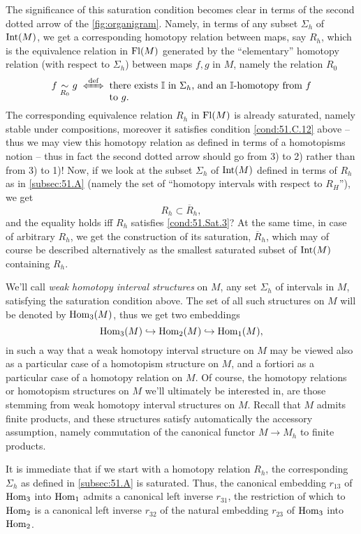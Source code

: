 The significance of this saturation condition becomes clear in terms
of the second dotted arrow of the \ref{fig:organigram}. Namely, in terms of any
subset $\Sigma_h$ of $\operatorname{Int}(M)$, we get a corresponding homotopy
relation between maps, say $R_h$, which is the equivalence relation in
$\operatorname{Fl}(M)$ generated by the ``elementary'' homotopy relation (with
respect to $\Sigma_h$) between maps $f,g$ in $M$, namely the relation $R_0$
\[ f \mathrel{\underset{R_0}{\sim}} g
\;\xLeftrightarrow{\textup{def}}\;
\parbox[t]{0.6\textwidth}{there exists
  \bI{} in $\Sigma_h$, and an \bI-homotopy from $f$ to $g$.}\]
The corresponding equivalence relation $R_h$ in $\operatorname{Fl}(M)$ is already
saturated, namely stable under compositions, moreover it satisfies
condition \ref{cond:51.C.12} above -- thus we may view this homotopy
relation as defined in terms of a homotopisms notion -- thus in fact
the second dotted arrow should go from 3) to 2) rather than from 3) to
1)! Now, if we look at the subset $\Sigma_h$ of $\operatorname{Int}(M)$
defined in terms of $R_h$ as in \ref{subsec:51.A} (namely the
set of ``homotopy intervals with respect to $R_H$''), we get
\[ R_h \subset \overline R_h,\]
and the equality holds if{f} $R_h$ satisfies \ref{cond:51.Sat.3}? At
the same time, in case of arbitrary $R_h$, we get the construction of
its saturation, $\overline R_h$, which may of course be described
alternatively as the smallest saturated subset of $\operatorname{Int}(M)$ containing
$R_h$.

We'll call \emph{weak homotopy interval structures} on $M$, any
set $\Sigma_h$ of intervals in $M$, satisfying the
saturation condition above. The set of all such structures on $M$ will
be denoted by $\operatorname{Hom}_3(M)$, thus we get two embeddings
\[ \operatorname{Hom}_3(M) \hookrightarrow \operatorname{Hom}_2(M) \hookrightarrow \operatorname{Hom}_1(M),\]
in such a way that a weak homotopy interval structure on $M$ may be
viewed also as a particular case of a homotopism structure on $M$, and
a fortiori as a particular case of a homotopy relation on $M$. Of
course, the homotopy relations or homotopism structures on $M$ we'll
ultimately be interested in, are those stemming from weak homotopy
interval structures on $M$. Recall that $M$ admits finite products,
and these structures satisfy automatically the accessory assumption,
namely commutation of the canonical functor $M\to M_h$ to finite
products.

It is immediate that if we start with a homotopy relation $R_h$, the
corresponding $\Sigma_h$ as defined in \ref{subsec:51.A} is
saturated. Thus, the canonical embedding $r_{13}$ of $\operatorname{Hom}_3$ into
$\operatorname{Hom}_1$ admits a canonical left inverse $r_{31}$, the restriction of
which to $\operatorname{Hom}_2$ is a canonical left inverse $r_{32}$ of the natural
embedding $r_{23}$ of $\operatorname{Hom}_3$ into $\operatorname{Hom}_2$.

